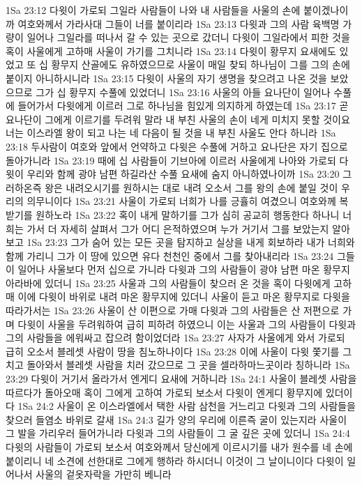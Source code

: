 1Sa 23:12  다윗이 가로되 그일라 사람들이 나와 내 사람들을 사울의 손에 붙이겠나이까 여호와께서 가라사대 그들이 너를 붙이리라
1Sa 23:13  다윗과 그의 사람 육백명 가량이 일어나 그일라를 떠나서 갈 수 있는 곳으로 갔더니 다윗이 그일라에서 피한 것을 혹이 사울에게 고하매 사울이 가기를 그치니라
1Sa 23:14  다윗이 황무지 요새에도 있었고 또 십 황무지 산골에도 유하였으므로 사울이 매일 찾되 하나님이 그를 그의 손에 붙이지 아니하시니라
1Sa 23:15  다윗이 사울의 자기 생명을 찾으려고 나온 것을 보았으므로 그가 십 황무지 수풀에 있었더니
1Sa 23:16  사울의 아들 요나단이 일어나 수풀에 들어가서 다윗에게 이르러 그로 하나님을 힘있게 의지하게 하였는데
1Sa 23:17  곧 요나단이 그에게 이르기를 두려워 말라 내 부친 사울의 손이 네게 미치지 못할 것이요 너는 이스라엘 왕이 되고 나는 네 다음이 될 것을 내 부친 사울도 안다 하니라
1Sa 23:18  두사람이 여호와 앞에서 언약하고 다윗은 수풀에 거하고 요나단은 자기 집으로 돌아가니라
1Sa 23:19  때에 십 사람들이 기브아에 이르러 사울에게 나아와 가로되 다윗이 우리와 함께 광야 남편 하길라산 수풀 요새에 숨지 아니하였나이까
1Sa 23:20  그러하온즉 왕은 내려오시기를 원하시는 대로 내려 오소서 그를 왕의 손에 붙일 것이 우리의 의무니이다
1Sa 23:21  사울이 가로되 너희가 나를 긍휼히 여겼으니 여호와께 복받기를 원하노라
1Sa 23:22  혹이 내게 말하기를 그가 심히 공교히 행동한다 하나니 너희는 가서 더 자세히 살펴서 그가 어디 은적하였으며 누가 거기서 그를 보았는지 알아보고
1Sa 23:23  그가 숨어 있는 모든 곳을 탐지하고 실상을 내게 회보하라 내가 너희와 함께 가리니 그가 이 땅에 있으면 유다 천천인 중에서 그를 찾아내리라
1Sa 23:24  그들이 일어나 사울보다 먼저 십으로 가니라 다윗과 그의 사람들이 광야 남편 마온 황무지 아라바에 있더니
1Sa 23:25  사울과 그의 사람들이 찾으러 온 것을 혹이 다윗에게 고하매 이에 다윗이 바위로 내려 마온 황무지에 있더니 사울이 듣고 마온 황무지로 다윗을 따라가서는
1Sa 23:26  사울이 산 이편으로 가매 다윗과 그의 사람들은 산 저편으로 가며 다윗이 사울을 두려워하여 급히 피하려 하였으니 이는 사울과 그의 사람들이 다윗과 그의 사람들을 에워싸고 잡으려 함이었더라
1Sa 23:27  사자가 사울에게 와서 가로되 급히 오소서 블레셋 사람이 땅을 침노하나이다
1Sa 23:28  이에 사울이 다윗 쫓기를 그치고 돌아와서 블레셋 사람을 치러 갔으므로 그 곳을 셀라하마느곳이라 칭하니라
1Sa 23:29  다윗이 거기서 올라가서 엔게디 요새에 거하니라
1Sa 24:1  사울이 블레셋 사람을 따르다가 돌아오매 혹이 그에게 고하여 가로되 보소서 다윗이 엔게디 황무지에 있더이다
1Sa 24:2  사울이 온 이스라엘에서 택한 사람 삼천을 거느리고 다윗과 그의 사람들을 찾으러 들염소 바위로 갈새
1Sa 24:3  길가 양의 우리에 이른즉 굴이 있는지라 사울이 그 발을 가리우러 들어가니라 다윗과 그의 사람들이 그 굴 깊은 곳에 있더니
1Sa 24:4  다윗의 사람들이 가로되 보소서 여호와께서 당신에게 이르시기를 내가 원수를 네 손에 붙이리니 네 소견에 선한대로 그에게 행하라 하시더니 이것이 그 날이니이다 다윗이 일어나서 사울의 겉옷자락을 가만히 베니라
